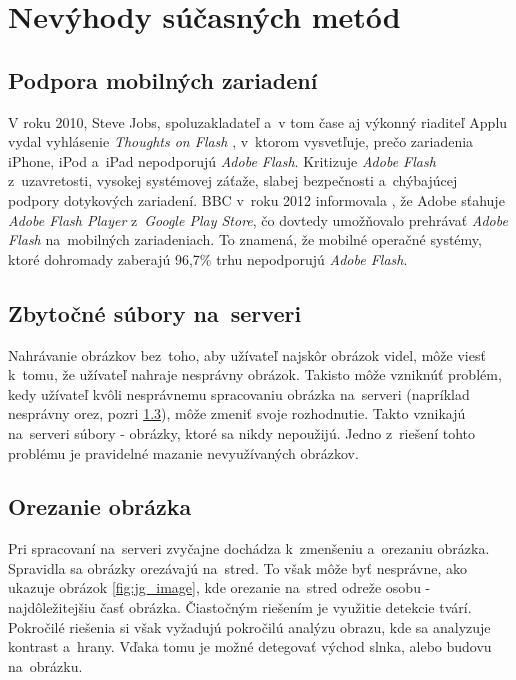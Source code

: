 \graphicspath{ {img/23/} }

\chapter{Nevýhody súčasných metód}
\section{Podpora mobilných zariadení}
\label{sec:mobile-support}

V roku 2010, Steve Jobs, spoluzakladateľ a~v tom čase aj výkonný riaditeľ Applu vydal vyhlásenie \emph{Thoughts on Flash} \cite{Apple_flash}, v~ktorom vysvetľuje, prečo zariadenia iPhone, iPod a~iPad nepodporujú \emph{Adobe Flash}. Kritizuje \emph{Adobe Flash} z~uzavretosti, vysokej systémovej záťaže, slabej bezpečnosti a~chýbajúcej podpory dotykových zariadení.
BBC v~roku 2012 informovala \cite{Android_flash}, že Adobe sťahuje \emph{Adobe Flash Player} z~\emph{Google Play Store}, čo dovtedy umožňovalo prehrávať \emph{Adobe Flash} na~mobilných zariadeniach. To znamená, že mobilné operačné systémy, ktoré dohromady zaberajú 96,7\% trhu \cite{Mobile_OS_share} nepodporujú \emph{Adobe Flash}.


\section{Zbytočné súbory na~serveri}

Nahrávanie obrázkov bez~toho, aby užívateľ najskôr obrázok videl, môže viesť k~tomu, že užívateľ nahraje nesprávny obrázok. Takisto môže vzniknúť problém, kedy užívateľ kvôli nesprávnemu spracovaniu obrázka na~serveri (napríklad nesprávny orez, pozri \ref{sec:orezanie-obrazka}), môže zmeniť svoje rozhodnutie. Takto vznikajú na~serveri súbory - obrázky, ktoré sa nikdy nepoužijú. Jedno z~riešení tohto problému je pravidelné mazanie nevyužívaných obrázkov.   

\section{Orezanie obrázka}
\label{sec:orezanie-obrazka}

Pri spracovaní na~serveri zvyčajne dochádza k~zmenšeniu a~orezaniu obrázka. Spravidla sa obrázky orezávajú na~stred. To však môže byť nesprávne, ako ukazuje obrázok \ref{fig:jg_image}, kde orezanie na~stred odreže osobu - najdôležitejšiu časť obrázka. Čiastočným riešením je využitie detekcie tvárí. Pokročilé riešenia si však vyžadujú pokročilú analýzu obrazu, kde sa analyzuje kontrast a~hrany. Vďaka tomu je možné detegovať východ slnka, alebo budovu na~obrázku. 

